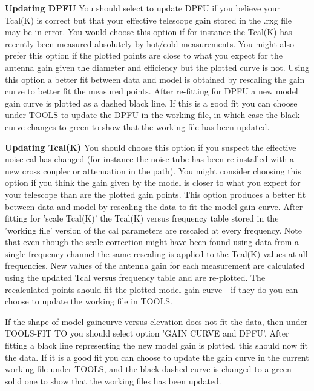    {\bf Updating DPFU} You should select to update 
   DPFU if you believe your Tcal(K) is correct but that 
   your effective telescope gain stored in the .rxg 
   file may be in error.  You would choose this 
   option if for instance the Tcal(K) has recently been 
   measured absolutely by hot/cold measurements. You might 
   also prefer this option if  the  plotted points are close to 
   what you expect for the antenna gain given 
   the diameter and efficiency but the plotted curve is not.
   Using this  option a better fit between data and model 
   is obtained  by rescaling the gain curve to better fit the measured 
   points. After re-fitting for DPFU  a new model gain curve  is plotted 
   as a dashed  black line. If this is a good fit you can choose
   under TOOLS to update the DPFU in the working file, in which 
   case the black curve changes to green to show that the working 
   file has been updated.
   
\vskip 0.5cm

   {\bf Updating Tcal(K)}  You should choose this  option if you
   suspect the effective noise cal has changed (for instance 
   the  noise tube has been re-installed with a new cross 
   coupler or attenuation in the path). You might 
   consider choosing  this option if you think the gain given by 
   the model is closer to what you expect for your telescope than  
   are the plotted gain points.  This option produces a better fit between 
   data and model by rescaling the data to fit the model gain curve. 
   After fitting for 'scale Tcal(K)' the Tcal(K) versus
   frequency table stored in the 'working file' version of the 
   cal parameters are rescaled at every frequency. Note that even though 
   the scale   correction might  have been found using data from a single 
   frequency  channel the same rescaling is applied to the Tcal(K) values 
   at all frequencies. New values of the antenna gain for each measurement 
   are calculated using the updated Tcal versus frequency table
   and are re-plotted. The recalculated points should fit the plotted 
   model gain curve - if they do you can choose to update the 
   working file in TOOLS.


\vskip 0.5cm
\vskip 0.5cm

    If the shape of 
    model gaincurve versus elevation does not fit  the data, then 
    under TOOLS-FIT TO you should select option 'GAIN CURVE and DPFU'.
    After fitting  a black line representing the new 
    model gain is plotted, this should now fit the data. If it is 
    a good fit  you can choose to update the gain curve in the current working 
    file under TOOLS, and the black dashed curve is changed to a 
    green solid one to show that the working files has been updated.


